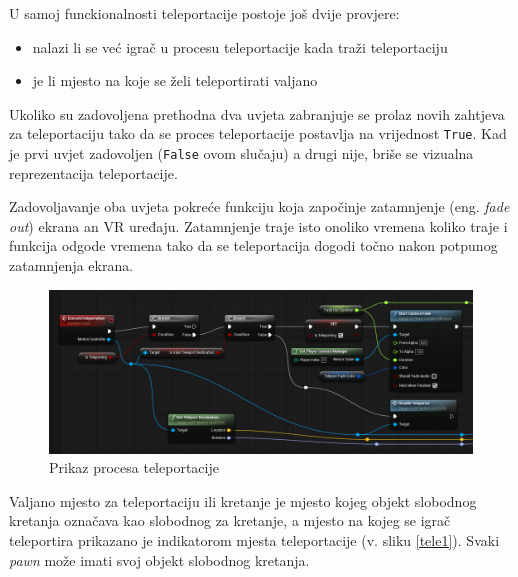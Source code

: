 \documentclass[a4paper,10pt]{article}
\begin{document}
U samoj funckionalnosti teleportacije postoje još dvije provjere:
\begin{itemize}
	\item nalazi li se već igrač u procesu teleportacije kada traži
		teleportaciju
	\item je li mjesto na koje se želi teleportirati valjano
\end{itemize}

Ukoliko su zadovoljena prethodna dva uvjeta zabranjuje
se prolaz novih zahtjeva za teleportaciju tako da se proces teleportacije
postavlja na vrijednost \texttt{True}. Kad je prvi uvjet zadovoljen
(\texttt{False} ovom slučaju) a drugi nije, briše se vizualna reprezentacija
teleportacije.

Zadovoljavanje oba uvjeta pokreće funkciju koja započinje zatamnjenje (eng.
\textit{fade out}) \marginpar{\color{teal}{fade out -- padanje mraka na oči}} ekrana an VR uređaju. Zatamnjenje traje isto onoliko vremena
koliko traje i funkcija odgode vremena tako da se teleportacija dogodi točno
nakon potpunog zatamnjenja ekrana.

\begin{figure}[!h]
	\centering
	\includegraphics[width=1\textwidth]{slike/04.png}
	\caption{Prikaz procesa teleportacije}
\end{figure}

Valjano mjesto za teleportaciju ili kretanje je mjesto kojeg objekt slobodnog
kretanja označava kao slobodnog za kretanje, a mjesto na kojeg se igrač
teleportira prikazano je indikatorom mjesta teleportacije (v. sliku \ref{tele1}). Svaki \textit{pawn}
\marginpar{\color{teal}{\small pawn -- fizička realizacija igrača u svijetu}}
može imati svoj objekt slobodnog kretanja.
\end{document}
